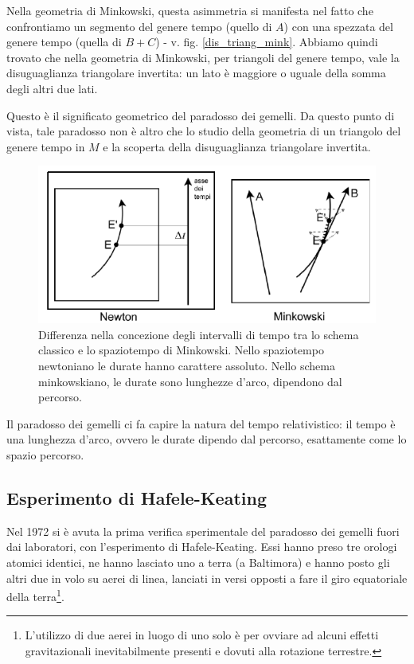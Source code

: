 Nella geometria di Minkowski, questa asimmetria si manifesta nel fatto
che confrontiamo un segmento del genere tempo (quello di $A$) con una spezzata
del genere tempo (quella di $B+C$) - v. fig. \ref{dis_triang_mink}. Abbiamo quindi trovato
che nella geometria di Minkowski, per triangoli del genere tempo, vale la disuguaglianza
triangolare invertita: un lato è maggiore o uguale della somma
degli altri due lati. 

Questo è il significato geometrico del paradosso dei gemelli. 
Da questo punto di vista, tale paradosso non è altro che lo studio
della geometria di un triangolo del genere tempo in $M$ e la scoperta della
disuguaglianza triangolare invertita.


\begin{figure}[htbp]
   \centering
   \includegraphics[scale=1]{immagini/conferme_relspec/tempi.png}
   \caption{\label{tempi}Differenza nella concezione degli intervalli di tempo tra lo 
schema classico e lo spaziotempo di Minkowski. Nello spaziotempo newtoniano le durate hanno carattere assoluto. 
Nello schema minkowskiano, le durate sono lunghezze d'arco, dipendono dal percorso.}
\end{figure}

Il paradosso dei gemelli ci fa capire la natura del tempo relativistico: il tempo è una lunghezza d'arco,
ovvero le durate dipendo dal percorso, esattamente come lo spazio percorso.

\subsection{Esperimento di Hafele-Keating}

Nel 1972 si è avuta la prima verifica sperimentale del paradosso dei gemelli
fuori dai laboratori, con l'esperimento di Hafele-Keating. Essi hanno preso
tre orologi atomici identici, ne hanno lasciato uno a terra (a Baltimora) e
hanno posto gli altri due in volo su aerei di linea, lanciati in versi opposti a
fare il giro equatoriale della terra\footnote{L'utilizzo di due aerei in luogo di uno solo è
per ovviare ad alcuni effetti gravitazionali inevitabilmente presenti e dovuti alla rotazione terrestre.}.

